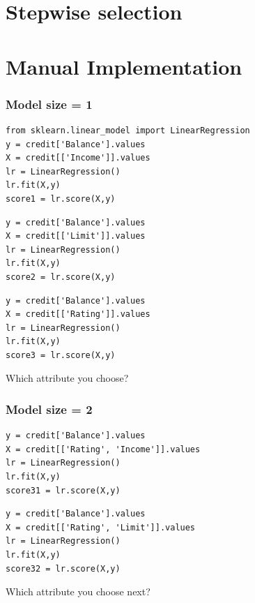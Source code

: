 \section{Stepwise selection}


\section{Manual Implementation}

\begin{frame}[fragile]\frametitle{Model size = 1}
\tiny	
\begin{lstlisting}
from sklearn.linear_model import LinearRegression
y = credit['Balance'].values
X = credit[['Income']].values
lr = LinearRegression()
lr.fit(X,y)
score1 = lr.score(X,y)
\end{lstlisting} 
\pause
\begin{lstlisting}
y = credit['Balance'].values
X = credit[['Limit']].values
lr = LinearRegression()
lr.fit(X,y)
score2 = lr.score(X,y)
\end{lstlisting} 
\pause
\begin{lstlisting}
y = credit['Balance'].values
X = credit[['Rating']].values
lr = LinearRegression()
lr.fit(X,y)
score3 = lr.score(X,y)
\end{lstlisting} 
Which attribute you choose?
\end{frame}

\begin{frame}[fragile]\frametitle{Model size = 2}
\tiny	
\begin{lstlisting}
y = credit['Balance'].values
X = credit[['Rating', 'Income']].values
lr = LinearRegression()
lr.fit(X,y)
score31 = lr.score(X,y)
\end{lstlisting} 
\pause
\begin{lstlisting}
y = credit['Balance'].values
X = credit[['Rating', 'Limit']].values
lr = LinearRegression()
lr.fit(X,y)
score32 = lr.score(X,y)
\end{lstlisting} 
Which attribute you choose next?
\end{frame}



